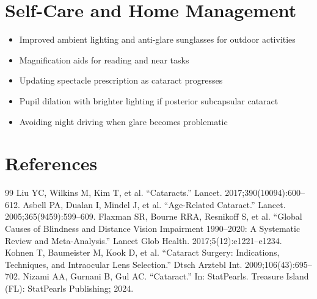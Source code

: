 \section*{Self-Care and Home Management}
\begin{itemize}
 \item Improved ambient lighting and anti-glare sunglasses for outdoor activities
 \item Magnification aids for reading and near tasks
 \item Updating spectacle prescription as cataract progresses
 \item Pupil dilation with brighter lighting if posterior subcapsular cataract
 \item Avoiding night driving when glare becomes problematic
\end{itemize}

\section*{References}
\begin{thebibliography}{99}
 Liu YC, Wilkins M, Kim T, et al. ``Cataracts.'' Lancet. 2017;390(10094):600--612.
 Asbell PA, Dualan I, Mindel J, et al. ``Age-Related Cataract.'' Lancet. 2005;365(9459):599--609.
 Flaxman SR, Bourne RRA, Resnikoff S, et al. ``Global Causes of Blindness and Distance Vision Impairment 1990--2020: A Systematic Review and Meta-Analysis.'' Lancet Glob Health. 2017;5(12):e1221--e1234.
 Kohnen T, Baumeister M, Kook D, et al. ``Cataract Surgery: Indications, Techniques, and Intraocular Lens Selection.'' Dtsch Arztebl Int. 2009;106(43):695--702.
 Nizami AA, Gurnani B, Gul AC. ``Cataract.'' In: StatPearls. Treasure Island (FL): StatPearls Publishing; 2024.
\end{thebibliography}

